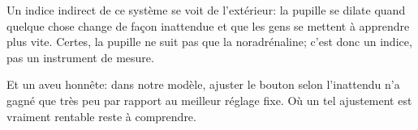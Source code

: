Un indice indirect de ce système se voit de l'extérieur: la pupille se dilate quand quelque chose change de façon inattendue et que les gens se mettent à apprendre plus vite. Certes, la pupille ne suit pas que la noradrénaline; c'est donc un indice, pas un instrument de mesure.

Et un aveu honnête: dans notre modèle, ajuster le bouton selon l'inattendu n'a gagné que très peu par rapport au meilleur réglage fixe. Où un tel ajustement est vraiment rentable reste à comprendre.

